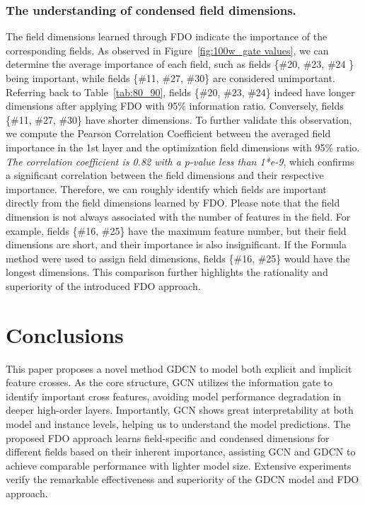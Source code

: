 \documentclass[sigconf]{acmart}
\begin{document}
\subsubsection{The understanding of condensed field dimensions.} 
\label{sec:relation}
The field dimensions learned through FDO indicate the importance of the corresponding fields. As observed in Figure~\ref{fig:100w_gate values}, we can determine the average importance of each field, such as fields \{\#20, \#23, \#24 \} being important, while fields \{\#11, \#27, \#30\} are considered unimportant. Referring back to Table~\ref{tab:80_90}, fields \{\#20, \#23, \#24\} indeed have longer dimensions after applying FDO with 95\% information ratio. Conversely, fields \{\#11, \#27, \#30\} have shorter dimensions. To further validate this observation, we compute the Pearson Correlation Coefficient between the averaged field importance in the 1st layer and the optimization field dimensions with 95\% ratio. \textit{The correlation coefficient is 0.82 with a p-value less than 1*e-9}, which confirms a significant correlation between the field dimensions and their respective importance. Therefore, we can roughly identify which fields are important directly from the field dimensions learned by FDO. Please note that the field dimension is not always associated with the number of features in the field. For example, fields \{\#16, \#25\} have the maximum feature number, but their field dimensions are short, and their importance is also insignificant. If the Formula method were used to assign field dimensions, fields \{\#16, \#25\} would have the longest dimensions. This comparison further highlights the rationality and superiority of the introduced FDO approach.

\section{Conclusions} 
This paper proposes a novel method GDCN to model both explicit and implicit feature crosses. As the core structure, GCN utilizes the information gate to identify important cross features, avoiding model performance degradation in deeper high-order layers. Importantly, GCN shows great interpretability at both model and instance levels, helping us to understand the model predictions. The proposed FDO approach learns field-specific and condensed dimensions for different fields based on their inherent importance, assisting GCN and GDCN to achieve comparable performance with lighter model size. Extensive experiments verify the remarkable effectiveness and superiority of the GDCN model and FDO approach.
\end{document}
